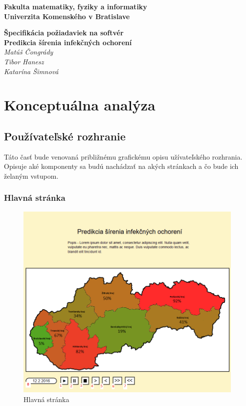 \documentclass[12pt,a4paper]{report}
\begin{document}
\begin{titlepage}
\centering\bfseries
		Fakulta matematiky, fyziky a informatiky\\Univerzita Komenského v Bratislave	

	\fontsize{23}{28}\textbf{Špecifikácia požiadaviek na softvér}\\
	\fontsize{16}{22}\textbf{Predikcia šírenia infekčných ochorení}\\
	\large\textit{Matúš Čongrády\\Tibor Hanesz\\Katarína Šimnová}

\end{titlepage}\bigskip
	\setcounter{tocdepth}{9}
	\tableofcontents

\renewcommand{\chaptername}{}	
\chapter[Konceptuálna analýza]{\rmfamily\bfseries
	Konceptuálna analýza}

\section[Používateľské rozhranie]{\rmfamily\bfseries
	Používateľské rozhranie}
Táto  časť  bude  venovaná približnému  grafickému  opisu užívateľského  rozhrania. Opisuje aké komponenty sa budú nachádzať na akých stránkach a čo bude ich želaným vstupom.

\subsection[Hlavná stránka]{\rmfamily\bfseries
	Hlavná stránka}

\begin{figure}[htb]
	\centering
	\includegraphics[scale=0.55]{hl_stranka}
	\caption{Hlavná stránka}
	\label{fig:Hlavná stránka}
\end{figure}
\end{document}
